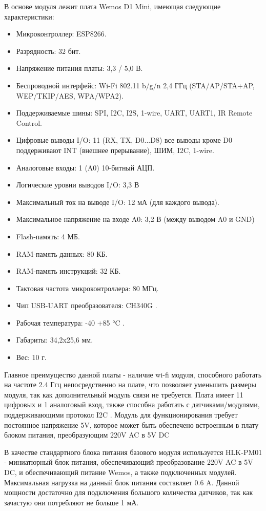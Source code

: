 В основе модуля лежит плата Wemos D1 Mini, имеющая следующие характеристики:
\begin{itemize}
	\item Микроконтроллер: ESP8266.
	\item Разрядность: 32 бит.
	\item Напряжение питания платы: 3,3 / 5,0 В.
	\item Беспроводной интерфейс: Wi-Fi 802.11 b/g/n 2,4 ГГц (STA/AP/STA+AP, WEP/TKIP/AES, WPA/WPA2).
	\item Поддерживаемые шины: SPI, I2C, I2S, 1-wire, UART, UART1, IR Remote Control.
	\item Цифровые выводы I/O: 11 (RX, TX, D0...D8) все выводы кроме D0 поддерживают INT (внешнее прерывание), ШИМ, I2C, 1-wire.
	\item Аналоговые входы: 1 (A0) 10-битный АЦП.
	\item Логические уровни выводов I/O: 3,3 В
	\item Максимальный ток на выводе I/O: 12 мА (для каждого вывода).
	\item Максимальное напряжение на входе A0: 3,2 В (между выводом A0 и GND)
	\item Flash-память: 4 МБ.
	\item RAM-память данных: 80 КБ.
	\item RAM-память инструкций: 32 КБ.
	\item Тактовая частота микроконтроллера: 80 МГц.
	\item Чип USB-UART преобразователя: CH340G .
	\item Рабочая температура: -40 +85 °C .
	\item Габариты: 34,2x25,6 мм.
	\item Вес: 10 г.
\end{itemize}
Главное преимущество данной платы - наличие wi-fi модуля, способного работать на частоте 2.4 Ггц непосредственно на плате, что позволяет уменьшить размеры модуля, так как дополнительный модуль связи не требуется.
Плата имеет 11 цифровых и 1 аналоговый вход, также способна работать с датчиками/модулями, поддерживающими протокол I2C .
Модуль для функционирования требует постоянное напряжение 5V, которое может быть обеспечено встроенным в плату блоком питания, преобразующим 220V AC в 5V DC

В качестве стандартного блока питания базового модуля используется HLK-PM01 - миниатюрный блок питания, обеспечивающий преобразование 220V AC в 5V DC, и обеспечивающий питание Wemos, а также подключенных модулей.
Максимальная нагрузка на данный блок питания составляет 0.6 A. Данной мощности достаточно для подключения большого количества датчиков, так как зачастую они потребляют не больше 1 мА.

